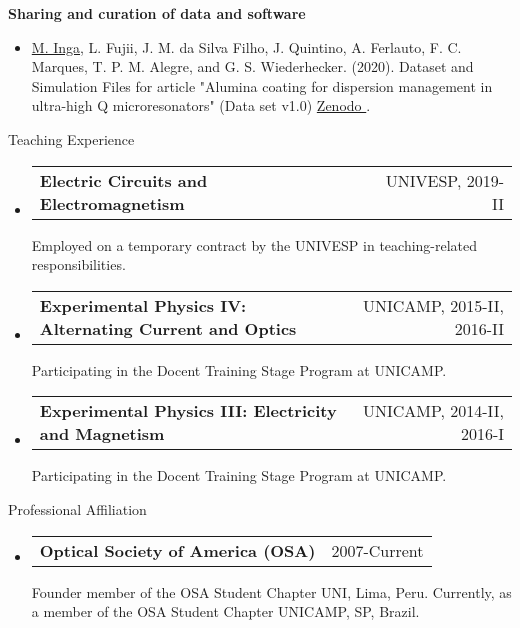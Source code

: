 \documentclass[letterpaper, 11pt]{article}[leftmargin=*]
\makeatletter
\renewcommand{\section}[2]{
  \colorbox{boxcol}{\color{secondary}\raggedbottom\normalsize{#1}{\hspace{2pt}#2}}
}
\newcommand{\resumeEntryStart}{\begin{itemize}[leftmargin=2.5mm]\itemsep8pt}
\newcommand{\resumeEntryEnd}{\end{itemize}}
\newcommand{\resumeItemListStart}{\begin{itemize}[leftmargin=4.5mm]\itemsep-3pt}
\newcommand{\resumeItemListEnd}{\end{itemize}}
\newcommand{\resumeItem}[1]{
  \item\small{
    {#1}
  }
}
\newcommand{\resumeEntryTD}[2]{
  \item[]
    \begin{tabularx}{0.97\textwidth}{X@{\hspace{60pt}}r}
      \textbf{\color{primary}#1} & {\firabook\color{accent}\small#2}
    \end{tabularx}\vspace{2pt}
}
\makeatother
\begin{document}
\textbf{Sharing and curation of data and software}
\vspace{-3pt}
\resumeItemListStart
\resumeItem {\footnotesize \underline{M. Inga}, L. Fujii, J. M. da Silva Filho, J. Quintino, A. Ferlauto, F. C. Marques, T. P. M. Alegre, and G. S. Wiederhecker. (2020). Dataset and Simulation Files for article "Alumina coating for dispersion management in ultra-high Q microresonators" (Data set v1.0) \href{https://zenodo.org/record/3932243}{Zenodo \faExternalLink}.}
\resumeItemListEnd

\section{\faPencil}{Teaching Experience}
\resumeEntryStart
\resumeEntryTD
{Electric Circuits and Electromagnetism}{\footnotesize UNIVESP, 2019-II\vspace{-0.2cm}} 
{\footnotesize Employed on a temporary contract by the UNIVESP in teaching-related responsibilities.}
\vspace{-0.3cm}
\resumeEntryTD
{Experimental Physics IV: Alternating Current and Optics}{\footnotesize UNICAMP, 2015-II, 2016-II\vspace{-0.2cm}}
{\footnotesize Participating in the Docent Training Stage Program at UNICAMP.}
\vspace{-0.3cm}
\resumeEntryTD
{Experimental Physics III: Electricity and Magnetism}{\footnotesize UNICAMP, 2014-II, 2016-I\vspace{-0.2cm}}
{\footnotesize Participating in the Docent Training Stage Program at UNICAMP.}
\resumeEntryEnd

\section{\faGroup}{Professional Affiliation}
\resumeEntryStart
\resumeEntryTD
{Optical Society of America (OSA)}{\footnotesize 2007-Current}
{\footnotesize Founder member of the OSA Student Chapter UNI, Lima, Peru. Currently, as a member of the OSA Student Chapter UNICAMP, SP, Brazil.}
\resumeEntryEnd

\end{document}
